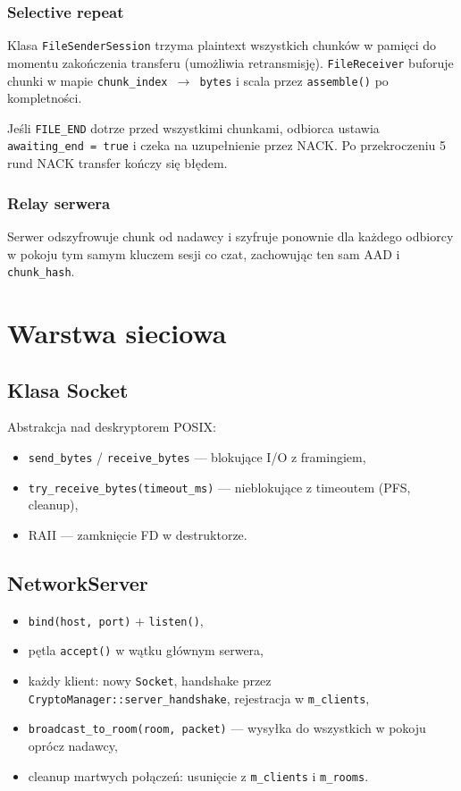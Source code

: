 \documentclass[12pt,a4paper]{article}
\begin{document}
\subsubsection{Selective repeat}

Klasa \texttt{FileSenderSession} trzyma plaintext wszystkich chunków w pamięci do momentu zakończenia transferu (umożliwia retransmisję). \texttt{FileReceiver} buforuje chunki w mapie \texttt{chunk\_index $\rightarrow$ bytes} i scala przez \texttt{assemble()} po kompletności.

Jeśli \texttt{FILE\_END} dotrze przed wszystkimi chunkami, odbiorca ustawia \texttt{awaiting\_end = true} i czeka na uzupełnienie przez NACK. Po przekroczeniu 5 rund NACK transfer kończy się błędem.

\subsubsection{Relay serwera}

Serwer odszyfrowuje chunk od nadawcy i szyfruje ponownie dla każdego odbiorcy w pokoju tym samym kluczem sesji co czat, zachowując ten sam AAD i \texttt{chunk\_hash}.

\section{Warstwa sieciowa}

\subsection{Klasa Socket}

Abstrakcja nad deskryptorem POSIX:
\begin{itemize}
    \item \texttt{send\_bytes} / \texttt{receive\_bytes} --- blokujące I/O z framingiem,
    \item \texttt{try\_receive\_bytes(timeout\_ms)} --- nieblokujące z timeoutem (PFS, cleanup),
    \item RAII --- zamknięcie FD w destruktorze.
\end{itemize}

\subsection{NetworkServer}

\begin{itemize}
    \item \texttt{bind(host, port)} + \texttt{listen()},
    \item pętla \texttt{accept()} w wątku głównym serwera,
    \item każdy klient: nowy \texttt{Socket}, handshake przez \texttt{CryptoManager::server\_handshake}, rejestracja w \texttt{m\_clients},
    \item \texttt{broadcast\_to\_room(room, packet)} --- wysyłka do wszystkich w pokoju oprócz nadawcy,
    \item cleanup martwych połączeń: usunięcie z \texttt{m\_clients} i \texttt{m\_rooms}.
\end{itemize}
\end{document}
